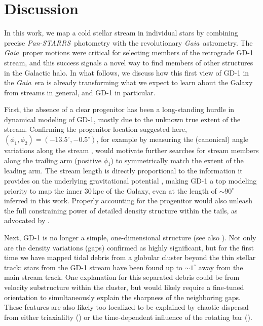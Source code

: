 \documentclass[modern]{aastex62}
\newcommand{\gaia}{\textsl{Gaia}}
\newcommand{\pans}{\textsl{Pan-STARRS}}
\newcommand{\kms}{\ensuremath{\textrm{km}~\textrm{s}^{-1}}}
\begin{document}
\section{Discussion}
\label{sec:discussion}

In this work, we map a cold stellar stream in individual stars by combining precise \pans\ photometry with the revolutionary \gaia\ astrometry.
The \gaia\ proper motions were critical for selecting members of the retrograde GD-1 stream, and this success signals a novel way to find members of other structures in the Galactic halo.
In what follows, we discuss how this first view of GD-1 in the \gaia\ era is already transforming what we expect to learn about the Galaxy from streams in general, and GD-1 in particular.

First, the absence of a clear progenitor has been a long-standing hurdle in dynamical modeling of GD-1, mostly due to the unknown true extent of the stream.
Confirming the progenitor location suggested here, $(\phi_1, \phi_2) = (-13.5^\circ,-0.5^\circ)$, for example by measuring the (canonical) angle variations along the stream \citep{Bovy:2014}, would motivate further searches for stream members along the trailing arm (positive $\phi_1$) to symmetrically match the extent of the leading arm.
The stream length is directly proportional to the information it provides on the underlying gravitational potential \citep{Bonaca:2018}, making GD-1 a top modeling priority to map the inner 30\,kpc of the Galaxy, even at the length of $\sim90^\circ$ inferred in this work.
Properly accounting for the progenitor would also unleash the full constraining power of detailed density structure within the tails, as advocated by \citet{Kupper:2015}.

Next, GD-1 is no longer a simple, one-dimensional structure (see also \citealt{DeBoer:2018}).
Not only are the density variations (gaps) confirmed as highly significant, but for the first time we have mapped tidal debris from a globular cluster beyond the thin stellar track: stars from the GD-1 stream have been found up to $\sim1^\circ$ away from the main stream track.
One explanation for this separated debris could be from velocity substructure within the cluster, but would likely require a fine-tuned orientation to simultaneously explain the sharpness of the neighboring gaps.
These features are also likely too localized to be explained by chaotic
dispersal from either triaxialilty (\citealt{Price-Whelan:2016}) or the
time-dependent influence of the rotating bar (\citealt{Pearson:2017}).
\end{document}
